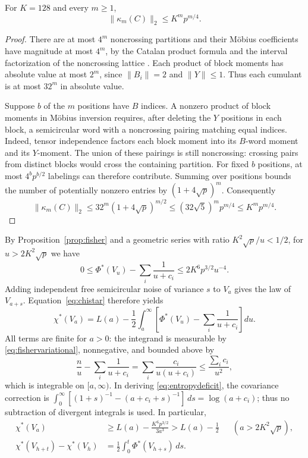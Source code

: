 \begin{lemma}\label{lem:cumulants}
For $K=128$ and every $m\geq1$,
\[
 \|\kappa_m(C)\|_2\leq K^m p^{m/4}.
\]
\end{lemma}

\begin{proof}
There are at most $4^m$ noncrossing partitions and their M\"obius
coefficients have magnitude at most $4^m$, by the Catalan product formula
and the interval factorization of the noncrossing lattice
\cite[Proposition~9.4, Theorem~9.29, and Propositions~10.14--10.15]{NS}.
Each product of block moments has absolute value at most $2^m$, since
$\|B_i\|=2$ and $\|Y\|\leq1$. Thus each cumulant is at most $32^m$
in absolute value.

Suppose $b$ of the $m$ positions have $B$ indices. A nonzero product of
block moments in M\"obius inversion requires, after deleting the $Y$
positions in each block, a semicircular word with a noncrossing pairing
matching equal indices. Indeed, tensor independence factors each block
moment into its $B$-word moment and its $Y$-moment. The union of these
pairings is still noncrossing:
crossing pairs from distinct blocks would cross the containing partition.
For fixed $b$ positions, at most $4^b p^{b/2}$ labelings can therefore
contribute. Summing over positions bounds the number of potentially
nonzero entries by $(1+4\sqrt p)^m$. Consequently
\[
 \|\kappa_m(C)\|_2\leq32^m(1+4\sqrt p)^{m/2}
 \leq(32\sqrt5)^m p^{m/4}\leq K^m p^{m/4}.
\]
\end{proof}

By Proposition~\ref{prop:fisher} and a geometric series with ratio
$K^2\sqrt p/u<1/2$, for
$u>2K^2\sqrt p$ we have
\begin{equation}\label{eq:specialfisher}
 0\leq\Phi^*(V_u)-\sum_i\frac1{u+c_i}
 \leq 2K^6p^{3/2}u^{-4}.
\end{equation}
Adding independent free semicircular noise of variance $s$ to $V_a$
gives the law of $V_{a+s}$. Equation~\eqref{eq:chistar} therefore yields
\begin{equation}\label{eq:entropydeficit}
 \chi^*(V_a)=L(a)-\frac12\int_a^\infty
 \left[\Phi^*(V_u)-\sum_i\frac1{u+c_i}\right]du.
\end{equation}
All terms are finite for $a>0$: the integrand is measurable by
\eqref{eq:fishervariational}, nonnegative, and bounded above by
\[
 \frac n u-\sum_i\frac1{u+c_i}
 =\sum_i\frac{c_i}{u(u+c_i)}
 \leq\frac{\sum_i c_i}{u^2},
\]
which is integrable on $[a,\infty)$. In deriving
\eqref{eq:entropydeficit}, the covariance correction is
$\int_0^\infty[(1+s)^{-1}-(a+c_i+s)^{-1}]\,ds=\log(a+c_i)$;
thus no subtraction of divergent integrals is used.
In particular,
\begin{align}
 \chi^*(V_a)&\geq L(a)-\frac{K^6p^{3/2}}{3a^3}>L(a)-\tfrac12
 &&(a>2K^2\sqrt p),\label{eq:largeentropy}\\
 \chi^*(V_{h+t})-\chi^*(V_h)
 &=\frac12\int_0^t\Phi^*(V_{h+s})\,ds.
 \label{eq:freeflow}
\end{align}

